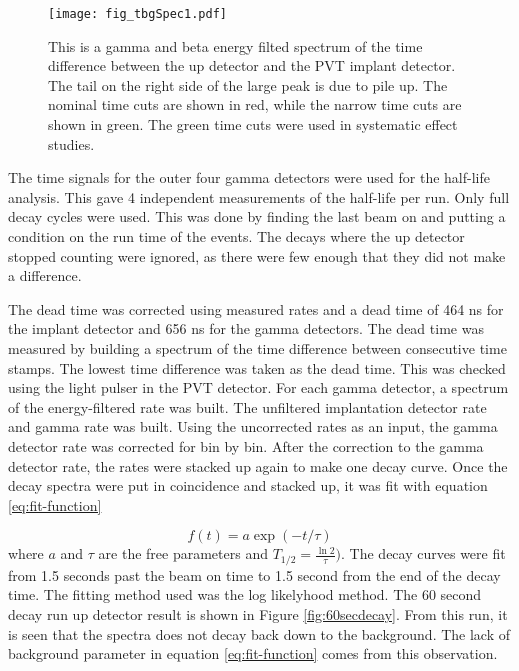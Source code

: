 \begin{figure}
	\centerline{\texttt{[image: fig\_tbgSpec1.pdf]}}	
	\caption{This is a gamma and beta energy filted spectrum of the time difference between the up detector and the PVT implant detector.
		The tail on the right side of the large peak is due to pile up.
		The nominal time cuts are shown in red, while the narrow time cuts are shown in green.
		The green time cuts were used in systematic effect studies.} 
	\label{fig:timediff}
\end{figure}


The time signals for the outer four gamma detectors were used for the half-life analysis.
This gave 4 independent measurements of the half-life per run. 
Only full decay cycles were used. 
This was done by finding the last beam on and putting a condition on the run time of the events.
The decays where the up detector stopped counting were ignored, as there were few enough that they did not make a difference. 

The dead time was corrected using measured rates and a dead time of 464 ns for the implant detector and 656 ns for the gamma detectors.  
The dead time was measured by building a spectrum of the time difference between consecutive time stamps.
The lowest time difference was taken as the dead  time. 
This was checked using the light pulser in the PVT detector.
For each gamma detector, a spectrum of the energy-filtered rate was built.
The unfiltered implantation detector rate and gamma rate was built.
Using the uncorrected rates as an input, the gamma detector rate was corrected for bin by bin.
After the correction to the gamma detector rate, the rates were stacked up again to make one decay curve.
Once the decay spectra were put in coincidence and stacked up, it was fit with equation \ref{eq:fit-function}

%
\begin{equation}
	f(t) = a\exp{(-t/\tau)}
	\label{eq:fit-function}
\end{equation}
%
where $a$ and $\tau$ are the free parameters and $T_{1/2} = \frac{\ln{2}}{\tau})$. 
The decay curves were fit from 1.5 seconds past the beam on time to 1.5 second from the end of the decay time. 
The fitting method used was the log likelyhood method. 
The 60 second decay run up detector result is shown in Figure \ref{fig:60secdecay}.
From this run, it is seen that the spectra does not decay back down to the background. 
The lack of background parameter in equation \ref{eq:fit-function} comes from this observation. 

